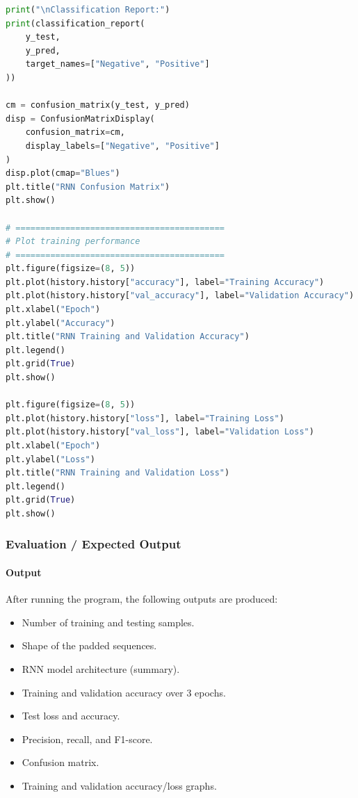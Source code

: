 \documentclass[a4paper,11pt]{article}
\begin{document}
\begin{itemize}
\begin{lstlisting}[language=Python, caption={RNN Implementation}]
print("\nClassification Report:")
print(classification_report(
    y_test,
    y_pred,
    target_names=["Negative", "Positive"]
))

cm = confusion_matrix(y_test, y_pred)
disp = ConfusionMatrixDisplay(
    confusion_matrix=cm,
    display_labels=["Negative", "Positive"]
)
disp.plot(cmap="Blues")
plt.title("RNN Confusion Matrix")
plt.show()

# ==========================================
# Plot training performance
# ==========================================
plt.figure(figsize=(8, 5))
plt.plot(history.history["accuracy"], label="Training Accuracy")
plt.plot(history.history["val_accuracy"], label="Validation Accuracy")
plt.xlabel("Epoch")
plt.ylabel("Accuracy")
plt.title("RNN Training and Validation Accuracy")
plt.legend()
plt.grid(True)
plt.show()

plt.figure(figsize=(8, 5))
plt.plot(history.history["loss"], label="Training Loss")
plt.plot(history.history["val_loss"], label="Validation Loss")
plt.xlabel("Epoch")
plt.ylabel("Loss")
plt.title("RNN Training and Validation Loss")
plt.legend()
plt.grid(True)
plt.show()
\end{lstlisting}

\subsubsection{Evaluation / Expected Output}

\paragraph{Output}
After running the program, the following outputs are produced:
\begin{itemize}
    \item Number of training and testing samples.
    \item Shape of the padded sequences.
    \item RNN model architecture (summary).
    \item Training and validation accuracy over 3 epochs.
    \item Test loss and accuracy.
    \item Precision, recall, and F1-score.
    \item Confusion matrix.
    \item Training and validation accuracy/loss graphs.
\end{itemize}


\end{itemize}
\end{document}
